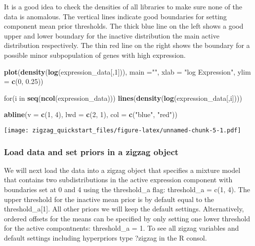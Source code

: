 \documentclass[]{article}
\newenvironment{Shaded}{\begin{snugshade}}{\end{snugshade}}
\newcommand{\KeywordTok}[1]{\textcolor[rgb]{0.13,0.29,0.53}{\textbf{{#1}}}}
\newcommand{\DataTypeTok}[1]{\textcolor[rgb]{0.13,0.29,0.53}{{#1}}}
\newcommand{\DecValTok}[1]{\textcolor[rgb]{0.00,0.00,0.81}{{#1}}}
\newcommand{\FloatTok}[1]{\textcolor[rgb]{0.00,0.00,0.81}{{#1}}}
\newcommand{\StringTok}[1]{\textcolor[rgb]{0.31,0.60,0.02}{{#1}}}
\newcommand{\NormalTok}[1]{{#1}}
\begin{document}
It is a good idea to check the densities of all libraries to make sure
none of the data is anomalous. The vertical lines indicate good
boundaries for setting component mean prior thresholds. The thick blue
line on the left shows a good upper and lower boundary for the inactive
distribution the main active distribution respectively. The thin red
line on the right shows the boundary for a possible minor subpopulation
of genes with high expression.

\begin{Shaded}
\begin{Highlighting}[]
\KeywordTok{plot}\NormalTok{(}\KeywordTok{density}\NormalTok{(}\KeywordTok{log}\NormalTok{(expression_data[,}\DecValTok{1}\NormalTok{])), }\DataTypeTok{main =}\StringTok{""}\NormalTok{, }\DataTypeTok{xlab =} \StringTok{"log Expression"}\NormalTok{, }\DataTypeTok{ylim =} \KeywordTok{c}\NormalTok{(}\DecValTok{0}\NormalTok{, }\FloatTok{0.25}\NormalTok{))}

\NormalTok{for(i in }\KeywordTok{seq}\NormalTok{(}\KeywordTok{ncol}\NormalTok{(expression_data))) }\KeywordTok{lines}\NormalTok{(}\KeywordTok{density}\NormalTok{(}\KeywordTok{log}\NormalTok{(expression_data[,i])))}

\KeywordTok{abline}\NormalTok{(}\DataTypeTok{v =} \KeywordTok{c}\NormalTok{(}\DecValTok{1}\NormalTok{, }\DecValTok{4}\NormalTok{), }\DataTypeTok{lwd =} \KeywordTok{c}\NormalTok{(}\DecValTok{2}\NormalTok{, }\DecValTok{1}\NormalTok{), }\DataTypeTok{col =} \KeywordTok{c}\NormalTok{(}\StringTok{"blue"}\NormalTok{, }\StringTok{"red"}\NormalTok{))}
\end{Highlighting}
\end{Shaded}

\texttt{[image: zigzag\_quickstart\_files/figure-latex/unnamed-chunk-5-1.pdf]}

\subsubsection{Load data and set priors in a zigzag
object}\label{load-data-and-set-priors-in-a-zigzag-object}

We will next load the data into a zigzag object that specifies a mixture
model that contains two subdistributions in the active expression
component with boundaries set at 0 and 4 using the threshold\_a flag:
threshold\_a = c(1, 4). The upper threshold for the inactive mean prior
is by default equal to the threshold\_a{[}1{]}. All other priors we will
keep the default settings. Alternatively, ordered offsets for the means
can be specified by only setting one lower threshold for the active
compontnents: threshold\_a = 1. To see all zigzag variables and default
settings including hyperpriors type ?zigzag in the R consol.
\end{document}
